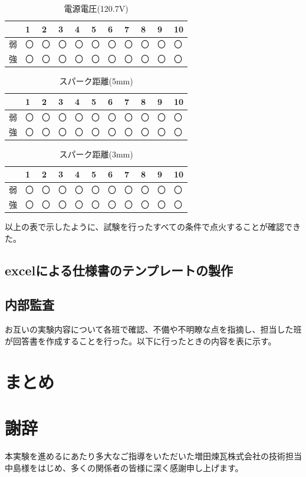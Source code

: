 \documentclass[upLaTeX,11pt]{ujarticle}
\begin{document}
\begin{table}[H]
    \centering
    \caption{電源電圧(120.7V)}
    \begin{tabular}{|l|l|l|l|l|l|l|l|l|l|l|}
        \hline
          & 1 & 2 & 3 & 4 & 5 & 6 & 7 & 8 & 9 & 10 \\ \hline
          弱 & 〇 & 〇 & 〇 & 〇 & 〇 & 〇 & 〇 & 〇 & 〇 & 〇  \\ \hline
          強 & 〇 & 〇 & 〇 & 〇 & 〇 & 〇 & 〇 & 〇 & 〇 & 〇  \\ \hline
    \end{tabular}
\end{table}

\begin{table}[H]
    \centering
    \caption{スパーク距離(5mm)}
    \begin{tabular}{|l|l|l|l|l|l|l|l|l|l|l|}
        \hline
          & 1 & 2 & 3 & 4 & 5 & 6 & 7 & 8 & 9 & 10 \\ \hline
          弱 & 〇 & 〇 & 〇 & 〇 & 〇 & 〇 & 〇 & 〇 & 〇 & 〇  \\ \hline
          強 & 〇 & 〇 & 〇 & 〇 & 〇 & 〇 & 〇 & 〇 & 〇 & 〇  \\ \hline
    \end{tabular}
\end{table}

\begin{table}[H]
    \centering
    \caption{スパーク距離(3mm)}
    \begin{tabular}{|l|l|l|l|l|l|l|l|l|l|l|}
        \hline
          & 1 & 2 & 3 & 4 & 5 & 6 & 7 & 8 & 9 & 10 \\ \hline
          弱 & 〇 & 〇 & 〇 & 〇 & 〇 & 〇 & 〇 & 〇 & 〇 & 〇  \\ \hline
          強 & 〇 & 〇 & 〇 & 〇 & 〇 & 〇 & 〇 & 〇 & 〇 & 〇  \\ \hline
    \end{tabular}
\end{table}

以上の表で示したように、試験を行ったすべての条件で点火することが確認できた。
\subsection{excelによる仕様書のテンプレートの製作}
\subsection{内部監査}
お互いの実験内容について各班で確認、不備や不明瞭な点を指摘し、担当した班が回答書を作成することを行った。以下に行ったときの内容を表に示す。
  
\section{まとめ}
\section{謝辞}
本実験を進めるにあたり多大なご指導をいただいた増田煉瓦株式会社の技術担当中島様をはじめ、多くの関係者の皆様に深く感謝申し上げます。
\end{document}
